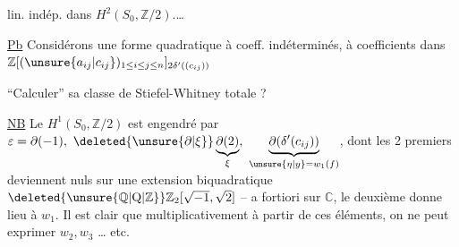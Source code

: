 

lin. indép. dans $H^2(S_0,\mathbb Z/2)$.\ldots

\uline{Pb} Considérons une forme quadratique  à coeff. indéterminés, à coefficients dans $\mathbb Z[(\unsure{a_{ij}|c_{ij}})_{1\leq i\leq j\leq n}]_{2\delta^{\prime}((c_{ij}))}$

``Calculer'' sa classe de Stiefel-Whitney totale ?

\uline{NB} Le $H^1(S_0,\mathbb Z/2)$  est engendré par $\varepsilon=\partial(-1),\ \deleted{\unsure{\partial|\xi}}\underbrace{\partial(2)}_{\xi},\ \underbrace{\partial(\delta'(c_{ij}))}_{\unsure{\eta|y}=w_1(f)}$, dont les 2 premiers deviennent nuls sur une extension biquadratique $\deleted{\unsure{\mathbb Q|\mathrm Q|\mathbb Z}}\mathbb Z_2[\sqrt{-1},\sqrt{2}]$ -- a fortiori sur $\mathbb C$, le deuxième donne lieu à $w_1$. Il est  clair que multiplicativement à partir de ces éléments, on ne peut exprimer  $w_2,w_3$ \ldots{} etc.

